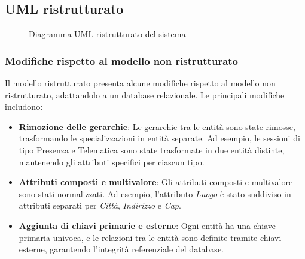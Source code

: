 \subsection{UML ristrutturato}
\begin{figure}[H]
    \noindent{}
    \caption{Diagramma UML ristrutturato del sistema}
\end{figure}
\subsubsection{Modifiche rispetto al modello non ristrutturato}
Il modello ristrutturato presenta alcune modifiche rispetto al modello non ristrutturato, adattandolo a un database relazionale. Le principali modifiche includono:
\begin{itemize}
    \item \textbf{Rimozione delle gerarchie}: Le gerarchie tra le entità sono state rimosse, trasformando le specializzazioni in entità separate. Ad esempio, le sessioni di tipo Presenza e Telematica sono state trasformate in due entità distinte, mantenendo gli attributi specifici per ciascun tipo.
    \item \textbf{Attributi composti e multivalore}: Gli attributi composti e multivalore sono stati normalizzati. Ad esempio, l'attributo \textit{Luogo} è stato suddiviso in attributi separati per \textit{Città}, \textit{Indirizzo} e \textit{Cap}.
    \item \textbf{Aggiunta di chiavi primarie e esterne}: Ogni entità ha una chiave primaria univoca, e le relazioni tra le entità sono definite tramite chiavi esterne, garantendo l'integrità referenziale del database.
\end{itemize}

